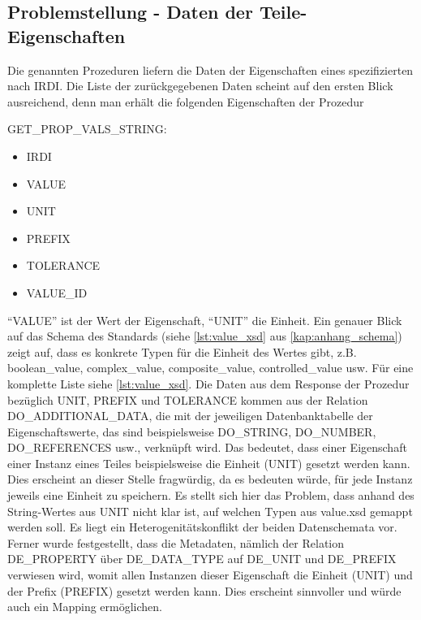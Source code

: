 \subsection{Problemstellung - Daten der Teile-Eigenschaften}\label{sec:problemdateneigenschaften}

Die genannten Prozeduren liefern die Daten der Eigenschaften eines spezifizierten  nach \gls{IRDI}. Die Liste der zurückgegebenen Daten scheint auf den ersten Blick ausreichend, denn man erhält die folgenden Eigenschaften der Prozedur

GET\_PROP\_VALS\_STRING:

\begin{itemize}
  \item IRDI
  \item VALUE
  \item UNIT
  \item PREFIX
  \item TOLERANCE
  \item VALUE\_ID
\end{itemize}

\enquote{VALUE} ist der Wert der Eigenschaft, \enquote{UNIT} die Einheit. Ein genauer Blick auf das Schema des Standards (siehe \autoref{lst:value_xsd} aus \autoref{kap:anhang_schema}) zeigt auf, dass es konkrete Typen für die Einheit des Wertes gibt, z.B. boolean\_value, complex\_value, composite\_value, controlled\_value usw. Für eine komplette Liste siehe \autoref{lst:value_xsd}. 
Die Daten aus dem Response der Prozedur bezüglich UNIT, PREFIX und TOLERANCE kommen aus der Relation DO\_ADDITIONAL\_DATA, die mit der jeweiligen Datenbanktabelle der Eigenschaftswerte, das sind beispielsweise DO\_STRING, DO\_NUMBER, DO\_REFERENCES usw., verknüpft wird. Das bedeutet, dass einer Eigenschaft einer Instanz eines Teiles beispielsweise die Einheit (UNIT) gesetzt werden kann. Dies erscheint an dieser Stelle fragwürdig, da es bedeuten würde, für jede Instanz jeweils eine Einheit zu speichern. 
Es stellt sich hier das Problem, dass anhand des String-Wertes aus UNIT nicht klar ist, auf welchen Typen aus value.xsd gemappt werden soll. Es liegt ein Heterogenitätskonflikt der beiden Datenschemata vor.  
Ferner wurde festgestellt, dass die Metadaten, nämlich der Relation DE\_PROPERTY über DE\_DATA\_TYPE auf DE\_UNIT und DE\_PREFIX verwiesen wird, womit allen Instanzen dieser Eigenschaft die Einheit (UNIT) und der Prefix (PREFIX) gesetzt werden kann. Dies erscheint sinnvoller und würde auch ein Mapping ermöglichen. 


